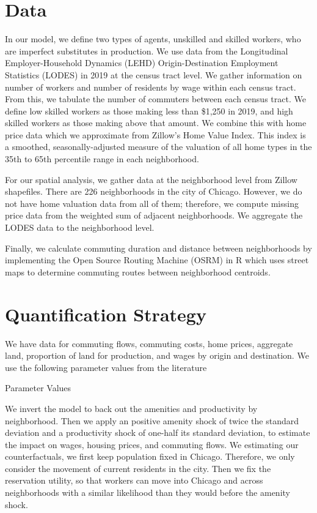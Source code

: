 \documentclass[12pt]{article}
\begin{document}
\section{Data}

In our model, we define two types of agents, unskilled and skilled workers, who are imperfect substitutes in production. We use data from the Longitudinal Employer-Household Dynamics (LEHD) Origin-Destination Employment Statistics (LODES) in 2019 at the census tract level. We gather information on number of workers and number of residents by wage within each census tract. From this, we tabulate the number of commuters between each census tract. We define low skilled workers as those making less than \$1,250 in 2019, and high skilled workers as those making above that amount. We combine this with home price data which we approximate from Zillow's Home Value Index. This index is a smoothed, seasonally-adjusted measure of the valuation of all home types in the 35th to 65th percentile range in each neighborhood. 

For our spatial analysis, we gather data at the neighborhood level from Zillow shapefiles. There are 226 neighborhoods in the city of Chicago. However, we do not have home valuation data from all of them; therefore, we compute missing price data from the weighted sum of adjacent neighborhoods. We aggregate the LODES data to the neighborhood level. 

Finally, we calculate commuting duration and distance between neighborhoods by implementing the Open Source Routing Machine (OSRM) in R which uses street maps to determine commuting routes between neighborhood centroids. 

\section{Quantification Strategy}

We have data for commuting flows, commuting costs, home prices, aggregate land, proportion of land for production, and wages by origin and destination. We use the following parameter values from the literature
\begin{table}[h]
    \centering
    \caption{Parameter Values}
    
    \label{tab:tab1}
\end{table}
We invert the model to back out the amenities and productivity by neighborhood. Then we apply an positive amenity shock of twice the standard deviation and a productivity shock of one-half its standard deviation, to estimate the impact on wages, housing prices, and commuting flows. We estimating our counterfactuals, we first keep population fixed in Chicago. Therefore, we only consider the movement of current residents in the city. Then we fix the reservation utility, so that workers can move into Chicago and across neighborhoods with a similar likelihood than they would before the amenity shock. 
\end{document}
